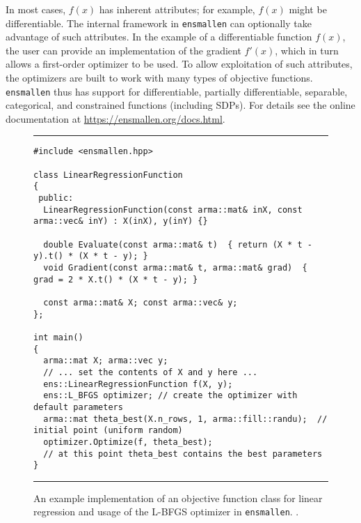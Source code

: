 \documentclass[twoside,11pt]{article}
\begin{document}
In most cases, $f(x)$ has inherent attributes;
for example, $f(x)$ might be differentiable.
The internal framework in {\tt ensmallen} can optionally take advantage of such attributes.
In the example of a differentiable function $f(x)$,
the user can provide an implementation of the gradient $f'(x)$,
which in turn allows a first-order optimizer to be used.
To allow exploitation of such attributes, the optimizers are built to work with
many types of objective functions.  {\tt ensmallen} thus has support for
differentiable, partially differentiable, separable, categorical, and
constrained functions (including SDPs).  For details
see the online documentation at \mbox{\url{https://ensmallen.org/docs.html}}.

\begin{figure}[t!]
\hrule
\vspace{1ex}
\centering
\begin{verbatim}
#include <ensmallen.hpp>

class LinearRegressionFunction
{
 public:
  LinearRegressionFunction(const arma::mat& inX, const arma::vec& inY) : X(inX), y(inY) {}

  double Evaluate(const arma::mat& t)  { return (X * t - y).t() * (X * t - y); }
  void Gradient(const arma::mat& t, arma::mat& grad)  { grad = 2 * X.t() * (X * t - y); }

  const arma::mat& X; const arma::vec& y;
};

int main()
{
  arma::mat X; arma::vec y;
  // ... set the contents of X and y here ...
  ens::LinearRegressionFunction f(X, y);
  ens::L_BFGS optimizer; // create the optimizer with default parameters
  arma::mat theta_best(X.n_rows, 1, arma::fill::randu);  // initial point (uniform random)
  optimizer.Optimize(f, theta_best);
  // at this point theta_best contains the best parameters
}
\end{verbatim}
\hrule
\vspace*{-0.5em}
\caption{An example implementation of an objective function class for linear
regression and usage of the L-BFGS optimizer in {\tt ensmallen}.
.
}
\label{fig:lr_function}
\vspace*{-2em}
\end{figure}
\end{document}
